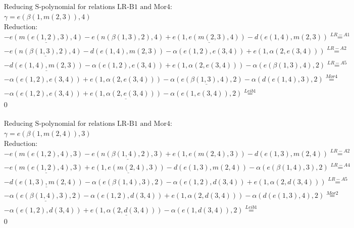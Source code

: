 \documentclass[11pt]{amsart}
\begin{document}
\begin{align*} 
& \text{Reducing S-polynomial for relations LR-B1 and Mor4:} \\ 
& \gamma = e(\beta(1,m(2,3)),4) \\ 
& \text{Reduction}: \\& - \underline{e(m(e(1,2),3),4)} - e(n(\beta(1,3),2),4) + \underline{e(1,e(m(2,3),4))} - d(e(1,4),m(2,3)) \stackrel{ LR-A1 }{=}  \\ 
& - \underline{e(n(\beta(1,3),2),4)} - d(e(1,4),m(2,3)) - \alpha(e(1,2),e(3,4)) + e(1,\alpha(2,e(3,4))) \stackrel{ LR-A2 }{=}  \\ 
& - \underline{d(e(1,4),m(2,3))} - \alpha(e(1,2),e(3,4)) + e(1,\alpha(2,e(3,4))) - \alpha(e(\beta(1,3),4),2) \stackrel{ LR-A5 }{=}  \\ 
& - \alpha(e(1,2),e(3,4)) + e(1,\alpha(2,e(3,4))) - \underline{\alpha(e(\beta(1,3),4),2)} - \alpha(d(e(1,4),3),2) \stackrel{ Mor4 }{=}  \\ 
& - \alpha(e(1,2),e(3,4)) + \underline{e(1,\alpha(2,e(3,4)))} - \alpha(e(1,e(3,4)),2) \stackrel{ Leib1 }{=}  \\ 
&0\\ 
\end{align*} 
 
\begin{align*} 
& \text{Reducing S-polynomial for relations LR-B1 and Mor4:} \\ 
& \gamma = e(\beta(1,m(2,4)),3) \\ 
& \text{Reduction}: \\& - e(m(e(1,2),4),3) - \underline{e(n(\beta(1,4),2),3)} + e(1,e(m(2,4),3)) - d(e(1,3),m(2,4)) \stackrel{ LR-A2 }{=}  \\ 
& - \underline{e(m(e(1,2),4),3)} + \underline{e(1,e(m(2,4),3))} - d(e(1,3),m(2,4)) - \alpha(e(\beta(1,4),3),2) \stackrel{ LR-A4 }{=}  \\ 
& - \underline{d(e(1,3),m(2,4))} - \alpha(e(\beta(1,4),3),2) - \alpha(e(1,2),d(3,4)) + e(1,\alpha(2,d(3,4))) \stackrel{ LR-A5 }{=}  \\ 
& - \underline{\alpha(e(\beta(1,4),3),2)} - \alpha(e(1,2),d(3,4)) + e(1,\alpha(2,d(3,4))) - \alpha(d(e(1,3),4),2) \stackrel{ Mor2 }{=}  \\ 
& - \alpha(e(1,2),d(3,4)) + \underline{e(1,\alpha(2,d(3,4)))} - \alpha(e(1,d(3,4)),2) \stackrel{ Leib1 }{=}  \\ 
&0\\ 
\end{align*} 
 
\end{document}
